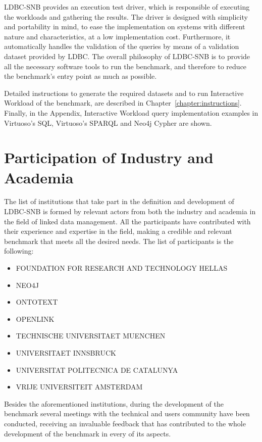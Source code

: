 LDBC-SNB provides an execution test driver, which is responsible of executing
the workloads and gathering the results. The driver is designed with simplicity
and portability in mind, to ease the implementation on systems with different
nature and characteristics, at a low implementation cost. Furthermore, it
automatically handles the validation of the queries by means of a validation
dataset provided by LDBC.  The overall philosophy of LDBC-SNB is to provide all
the necessary software tools to run the benchmark, and therefore to reduce the
benchmark's entry point as much as possible.

Detailed instructions to generate the required datasets and to run Interactive
Workload of the benchmark, are described in Chapter~\ref{chapter:instructions}.
Finally, in the Appendix, Interactive Workload query implementation examples in
Virtuoso's SQL, Virtuoso's SPARQL and Neo4j Cypher are shown.


\section{Participation of Industry and Academia}

The list of institutions that take part in the definition and development
of LDBC-SNB is formed by relevant actors from both the industry and academia in
the field of linked data management. All the participants have contributed with
their experience and expertise in the field, making a credible and relevant
benchmark that meets all the desired needs. The list of participants is the
following:

\begin{itemize}
    \item FOUNDATION FOR RESEARCH AND TECHNOLOGY HELLAS
    \item NEO4J
    \item ONTOTEXT
    \item OPENLINK
    \item TECHNISCHE UNIVERSITAET MUENCHEN
    \item UNIVERSITAET INNSBRUCK
    \item UNIVERSITAT POLITECNICA DE CATALUNYA
    \item VRIJE UNIVERSITEIT AMSTERDAM
\end{itemize}

\begin{figure}
\end{figure}

Besides the aforementioned institutions, during the development of the
benchmark several meetings with the technical and users community have been
conducted, receiving an invaluable feedback that has contributed to the whole
development of the benchmark in every of its aspects.


